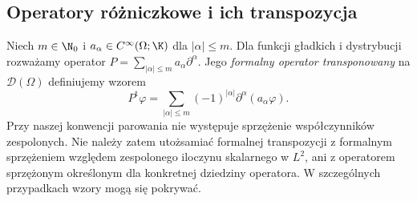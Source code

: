 \subsection{Operatory różniczkowe i ich transpozycja}

\begin{definicja}
\label{def:formal-transpose20}
Niech $m\in\N_0$ i $a_\alpha\in C^\infty(\Omega;\K)$
dla $|\alpha|\le m$. Dla funkcji gładkich i dystrybucji
rozważamy operator $P=\sum_{|\alpha|\le m}a_\alpha\partial^\alpha$.
Jego \emph{formalny operator transponowany} na $\mathcal D(\Omega)$
definiujemy wzorem
\[
 P^{\mathrm t}\varphi=
 \sum_{|\alpha|\le m}(-1)^{|\alpha|}
 \partial^\alpha(a_\alpha\varphi).
\]
Przy naszej konwencji parowania nie występuje sprzężenie
współczynników zespolonych. Nie należy zatem utożsamiać
formalnej transpozycji z formalnym sprzężeniem względem
zespolonego iloczynu skalarnego w $L^2$, ani z operatorem
sprzężonym określonym dla konkretnej dziedziny operatora.
W szczególnych przypadkach wzory mogą się pokrywać.
\end{definicja}

